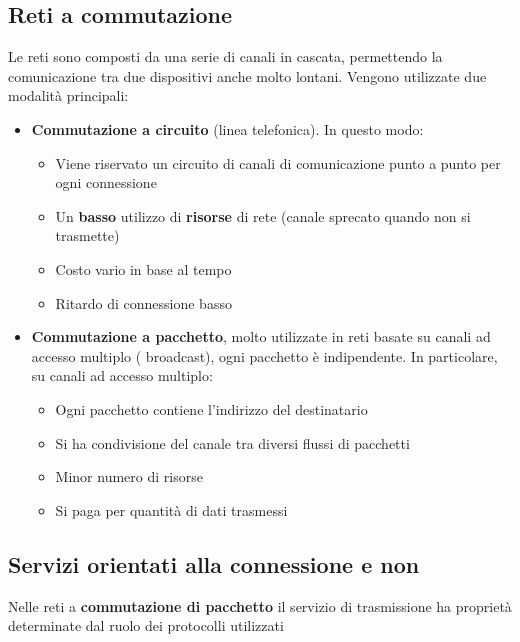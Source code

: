\documentclass{article}
\begin{document}
\subsection{Reti a commutazione}
Le reti sono composti da una serie di canali in cascata, permettendo la comunicazione tra due dispositivi anche molto lontani. Vengono utilizzate due modalità principali:
\begin{itemize}
    \item \textbf{Commutazione a circuito} (linea telefonica). In questo modo:
    \begin{itemize}
        \item Viene riservato un circuito di canali di comunicazione punto a punto per ogni connessione
        \item Un \textbf{basso} utilizzo di \textbf{risorse} di rete (canale sprecato quando non si trasmette)
        \item Costo vario in base al tempo
        \item Ritardo di connessione basso
    \end{itemize}
    \item \textbf{Commutazione a pacchetto}, molto utilizzate in reti basate su canali ad accesso multiplo ( broadcast), ogni pacchetto è indipendente. In particolare, su canali ad accesso multiplo:
    \begin{itemize}
        \item Ogni pacchetto contiene l'indirizzo del destinatario
        \item Si ha condivisione del canale tra diversi flussi di pacchetti
        \item Minor numero di risorse
        \item Si paga per quantità di dati trasmessi
    \end{itemize}
\end{itemize}

\subsection{Servizi orientati alla connessione e non}
Nelle reti a \textbf{commutazione di pacchetto} il servizio di trasmissione ha proprietà determinate dal ruolo dei protocolli utilizzati
\end{document}
